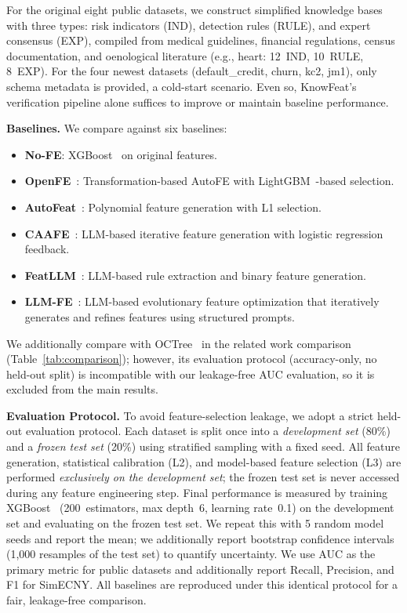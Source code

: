 For the original eight public datasets, we construct simplified knowledge bases with three types: risk indicators (IND), detection rules (RULE), and expert consensus (EXP), compiled from medical guidelines, financial regulations, census documentation, and oenological literature (e.g., heart: 12~IND, 10~RULE, 8~EXP). For the four newest datasets (default\_credit, churn, kc2, jm1), only schema metadata is provided, a cold-start scenario. Even so, KnowFeat's verification pipeline alone suffices to improve or maintain baseline performance.

\textbf{Baselines.}
We compare against six baselines:
\begin{itemize}
    \item \textbf{No-FE}: XGBoost~\cite{chen2016xgboost} on original features.
    \item \textbf{OpenFE}~\cite{zhang2023openfe}: Transformation-based AutoFE with LightGBM~\cite{ke2017lightgbm}-based selection.
    \item \textbf{AutoFeat}~\cite{horn2019autofeat}: Polynomial feature generation with L1 selection.
    \item \textbf{CAAFE}~\cite{hollmann2023caafe}: LLM-based iterative feature generation with logistic regression feedback.
    \item \textbf{FeatLLM}~\cite{han2024featllm}: LLM-based rule extraction and binary feature generation.
    \item \textbf{LLM-FE}~\cite{abhyankar2025llmfe}: LLM-based evolutionary feature optimization that iteratively generates and refines features using structured prompts.
\end{itemize}
We additionally compare with OCTree~\cite{nam2024octree} in the related work comparison (Table~\ref{tab:comparison}); however, its evaluation protocol (accuracy-only, no held-out split) is incompatible with our leakage-free AUC evaluation, so it is excluded from the main results.

\textbf{Evaluation Protocol.}
To avoid feature-selection leakage, we adopt a strict held-out evaluation protocol. Each dataset is split once into a \emph{development set} (80\%) and a \emph{frozen test set} (20\%) using stratified sampling with a fixed seed. All feature generation, statistical calibration (L2), and model-based feature selection (L3) are performed \emph{exclusively on the development set}; the frozen test set is never accessed during any feature engineering step.
Final performance is measured by training XGBoost~\cite{chen2016xgboost} (200~estimators, max depth~6, learning rate~0.1) on the development set and evaluating on the frozen test set. We repeat this with 5 random model seeds and report the mean; we additionally report bootstrap confidence intervals (1{,}000 resamples of the test set) to quantify uncertainty. We use AUC as the primary metric for public datasets and additionally report Recall, Precision, and F1 for SimECNY. All baselines are reproduced under this identical protocol for a fair, leakage-free comparison.

